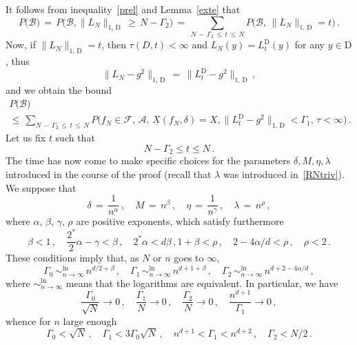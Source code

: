 \documentclass[AHL, Unicode, longabstracts, published]{cedram}
\newcommand{\XX}{{\underline{X}}}
\newcommand*\lsim{\mathop{\sim}^{\ln}_{n\to\infty}}
\newcommand*\tD{\mathrm{D}}%
\newcommand{\cA}{\mathcal{A}}
\newcommand{\cB}{\mathcal{B}}
\newcommand{\cF}{\mathcal{F}}
\begin{document}
It follows from inequality~\eqref{prel} and Lemma~\ref{exte} that
\begin{equation*}
P\big(\cB)
\,=\, P\big(
\cB, \|L_N\|_{1,\,\tD}\,\geq\,N-\Gamma_2
\big)
\,=\,
\sum_{N\,-\,\Gamma_2\,\leq\,t\,\leq\,N} P\big(
\cB,\, \|L_N\|_{1,\,\tD}=t
\big)\,.
\end{equation*}
Now, if $\|L_N\|_{1,\,\tD}=t$, then $\tau(D,t)<\infty$ and $L_N(y)=L_t^{\tD}(y)$ for any $y\in \tD$, thus
\[
\|L_N-g^2\|_{1,\,\tD}\,=\,
\|L_t^{\tD}-g^2\|_{1,\,\tD}\,,
\]
and we obtain the bound
\begin{multline}\label{intera}
P\big(\cB\big)\\
\leq\,\sum_{N\,-\,\Gamma_2\,\leq\,t\,\leq\,N} P\big(f_N\in\cF,\,\cA,\,\XX(f_N,\delta)
=X, \|L_t^{\tD}-g^2\|_{1,\,\tD}<\Gamma_1,\,\tau<\infty
\big)\,.
\end{multline}
Let us fix $t$ such that
\begin{equation}\label{contg}
N-\Gamma_2\leq t\leq N\,.
\end{equation}
The time has now come to make specific choices for the parameters $\delta,M,\eta,\lambda$ introduced in the course of the proof (recall that $\lambda$ was introduced in~\eqref{RNtriv}). We suppose that
\begin{equation}
\delta\,=\,\frac{1}{n^\alpha}\,,\quad M\,=\,n^\beta\,,\quad
\eta\,=\,\frac{1}{n^\gamma}\,,\quad
\lambda\,=\,{n^\rho}\,,\label{expos}
\end{equation}
where $\alpha,\,\beta,\,\gamma,\,\rho$ are positive exponents, which satisfy furthermore
\begin{equation}\label{furco}
\beta<1\,,\quad \frac{2^*}{2}\alpha-\gamma<\beta\,,\quad 2^*\alpha<d\beta\,,
 1+\beta<\rho\,,\quad 2-4\alpha/d<\rho\,,\quad
\rho<2\,.
\end{equation}
These conditions imply that, as $N$ or $n$ goes to $\infty$,
\begin{equation}\label{dxr}
\Gamma_0\,\lsim\,n^{d/2+\beta}\,,\quad
\Gamma_1\,\lsim\,n^{d+1+\beta}\,,\quad
\Gamma_2\,\lsim\,n^{d+2-4\alpha/d}\,,
\end{equation}
where $\lsim$ means that the logarithms are equivalent. In particular, we have
\begin{equation}\label{der}
\frac{\Gamma_0}{\sqrt N}\to0\,,\quad
\frac{\Gamma_1}{N}\to0\,,\quad
\frac{\Gamma_2}{N}\to0\,,\quad
\frac{n^{d+1}}{\Gamma_1}\to0\,,
\end{equation}
whence for $n$ large enough
\begin{equation}\label{aer}
\Gamma_0<\sqrt{N}\,,\quad
\Gamma_1<3\Gamma_0\sqrt{N}\,,\quad n^{d+1}<\Gamma_1<n^{d+2}\,,\quad
\Gamma_2<N/2\,.
\end{equation}
\end{document}
